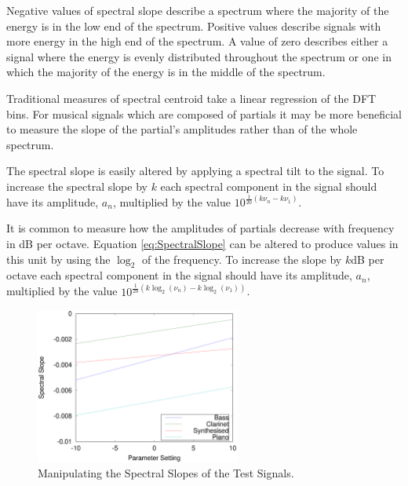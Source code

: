 		Negative values of spectral slope describe a spectrum where the majority of the energy is in the low end of
		the spectrum. Positive values describe signals with more energy in the high end of the spectrum. A value of
		zero describes either a signal where the energy is evenly distributed throughout the spectrum or one in
		which the majority of the energy is in the middle of the spectrum.

		Traditional measures of spectral centroid take a linear regression of the DFT bins. For musical signals
		which are composed of partials it may be more beneficial to measure the slope of the partial's amplitudes
		rather than of the whole spectrum. 
		
		The spectral slope is easily altered by applying a spectral tilt to the signal. To increase the spectral
		slope by $k$ each spectral component in the signal should have its amplitude, $a_{n}$, multiplied by the
		value $10^{\frac{1}{20}(k\nu_{n} - k\nu_{1})}$.

		It is common to measure how the amplitudes of partials decrease with frequency in dB per octave. Equation
		\ref{eq:SpectralSlope} can be altered to produce values in this unit by using the $\log_{2}$ of the
		frequency. To increase the slope by $k$dB per octave each spectral component in the signal should have its
		amplitude, $a_{n}$, multiplied by the value $10^{\frac{1}{20}(k\log_{2}(\nu_{n}) - k\log_{2}(\nu_{1}))}$.

		\begin{figure}[h!]
			\centering
			\includegraphics[width=0.6\textwidth]{chapter6/Images/MoveSlopes.eps}
			\caption{Manipulating the Spectral Slopes of the Test Signals.}
			\label{fig:MoveSlopes}
		\end{figure}

